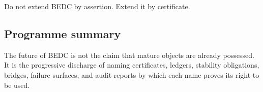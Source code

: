 \begin{corollary}
\label{cor:philosophy-programme-execution-maxim}
Do not extend BEDC by assertion. Extend it by certificate.
\end{corollary}

\subsection{Programme summary}
\label{subsec:philosophy-programme-summary}

\begin{definition}
\label{def:philosophy-programme-compression}
The future of BEDC is not the claim that mature objects are already
possessed. It is the progressive discharge of naming certificates,
ledgers, stability obligations, bridges, failure surfaces, and audit
reports by which each name proves its right to be used.
\end{definition}
